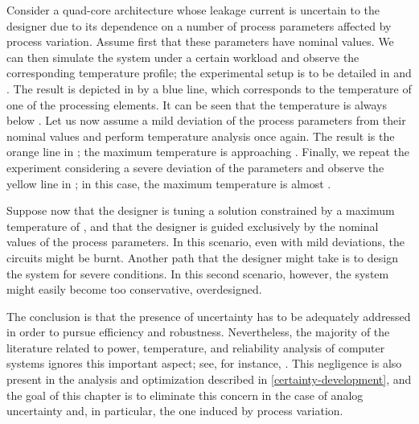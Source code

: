 Consider a quad-core architecture whose leakage current is uncertain to the
designer due to its dependence on a number of process parameters affected by
process variation. Assume first that these parameters have nominal values. We
can then simulate the system under a certain workload and observe the
corresponding temperature profile; the experimental setup is to be detailed in
 and . The
result is depicted in  by a blue line, which corresponds to
the temperature of one of the processing elements. It can be seen that the
temperature is always below . Let us now assume a mild deviation of
the process parameters from their nominal values and perform temperature
analysis once again. The result is the orange line in ; the
maximum temperature is approaching . Finally, we repeat the
experiment considering a severe deviation of the parameters and observe the
yellow line in ; in this case, the maximum temperature is
almost .

Suppose now that the designer is tuning a solution constrained by a maximum
temperature of , and that the designer is guided exclusively by the
nominal values of the process parameters. In this scenario, even with mild
deviations, the circuits might be burnt. Another path that the designer might
take is to design the system for severe conditions. In this second scenario,
however, the system might easily become too conservative, overdesigned.

The conclusion is that the presence of uncertainty has to be adequately
addressed in order to pursue efficiency and robustness. Nevertheless, the
majority of the literature related to power, temperature, and reliability
analysis of computer systems ignores this important aspect; see, for instance,
\cite{rao2009, rai2011, thiele2011}. This negligence is also present in the
analysis and optimization described in \cref{certainty-development}, and the
goal of this chapter is to eliminate this concern in the case of analog
uncertainty and, in particular, the one induced by process variation.
